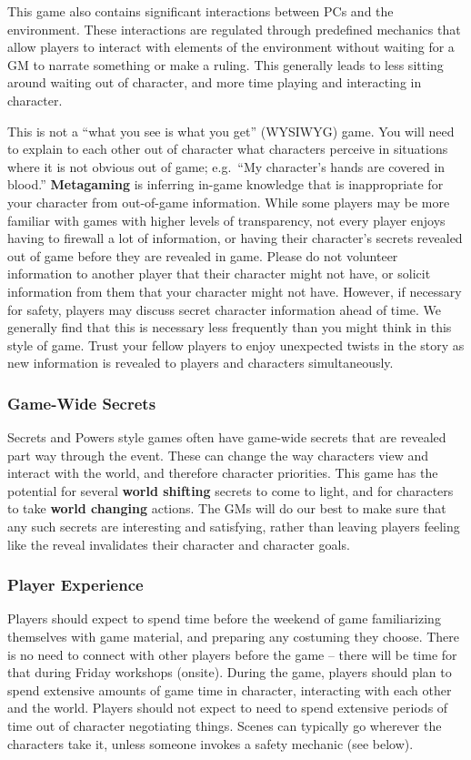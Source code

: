 \documentclass[sheet]{GL2020}
\begin{document}
This game also contains significant interactions between PCs and the environment. These interactions are regulated through predefined mechanics that allow players to interact with elements of the environment without waiting for a GM to narrate something or make a ruling. This generally leads to less sitting around waiting out of character, and more time playing and interacting in character. 

This is not a ``what you see is what you get'' (WYSIWYG) game. You will need to explain to each other out  of character what characters perceive in situations where it is not obvious out of game; e.g.\ ``My character's hands are covered in blood.'' {\bf Metagaming} is inferring in-game knowledge that is inappropriate for your character from out-of-game information. While some players may be more familiar with games with higher levels of transparency, not every player enjoys having to firewall a lot of information, or having their character's secrets revealed out of game before they are revealed in game. Please do not volunteer information to another player that their character might not have, or solicit information from them that your character might not have. However, if necessary for safety, players may discuss secret character information ahead of time. We generally find that this is necessary less frequently than you might think in this style of game. Trust your fellow players to enjoy unexpected twists in the story as new information is revealed to players and characters simultaneously.

\subsubsection{Game-Wide Secrets}
Secrets and Powers style games often have game-wide secrets that are revealed part way through the event. These can change the way characters view and interact with the world, and therefore character priorities. This game has the potential for several \textbf{world shifting} secrets to come to light, and for characters to take \textbf{world changing} actions. The GMs will do our best to make sure that any such secrets are interesting and satisfying, rather than leaving players feeling like the reveal invalidates their character and character goals. 

\subsubsection{Player Experience}
Players should expect to spend time before the weekend of game familiarizing themselves with game material, and preparing any costuming they choose. There is no need to connect with other players before the game -- there will be time for that during Friday workshops (onsite). During the game, players should plan to spend extensive amounts of game time in character, interacting with each other and the world. Players should not expect to need to spend extensive periods of time out of character negotiating things. Scenes can typically go wherever the characters take it, unless someone invokes a safety mechanic (see below).
\end{document}

